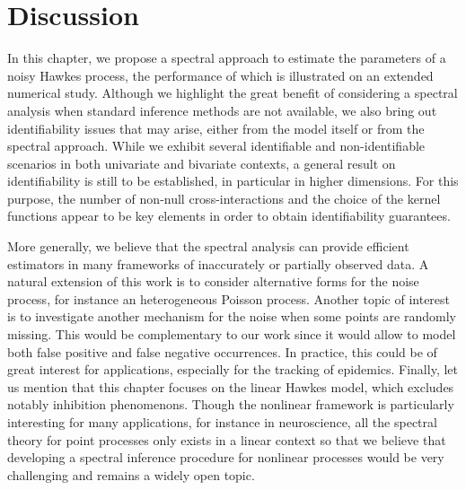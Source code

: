 		\section{Discussion}

In this chapter, we propose a spectral approach to estimate the parameters of a noisy Hawkes process, the performance of which is illustrated on an extended numerical study. Although we highlight the great benefit of considering a spectral analysis when standard inference methods are not available, we also bring out  identifiability issues that may arise, either from the model itself or from the spectral approach. While we exhibit several identifiable and non-identifiable scenarios in both univariate and bivariate contexts, a general result on identifiability is still to be established, in particular in higher dimensions. For this purpose, the number of non-null cross-interactions and the choice of the kernel functions appear to be key elements in order to obtain identifiability guarantees.

More generally, we believe that the spectral analysis can provide efficient estimators in many frameworks of inaccurately or partially observed data. A natural extension of this work is to consider alternative forms for the noise process, for instance an heterogeneous Poisson process. Another topic of interest is to investigate another mechanism for the noise when some points are randomly missing. This would be complementary to our work since it would allow to model both false positive and false negative occurrences. In practice, this could be of great interest for applications, especially for the tracking of epidemics. Finally, let us mention that this chapter focuses on the linear Hawkes model, which excludes notably inhibition phenomenons. Though the nonlinear framework is particularly interesting for many applications, for instance in neuroscience, all the spectral theory for point processes only exists in a linear context so that we believe that developing a spectral inference procedure for nonlinear processes would be very challenging and remains a widely open topic.

